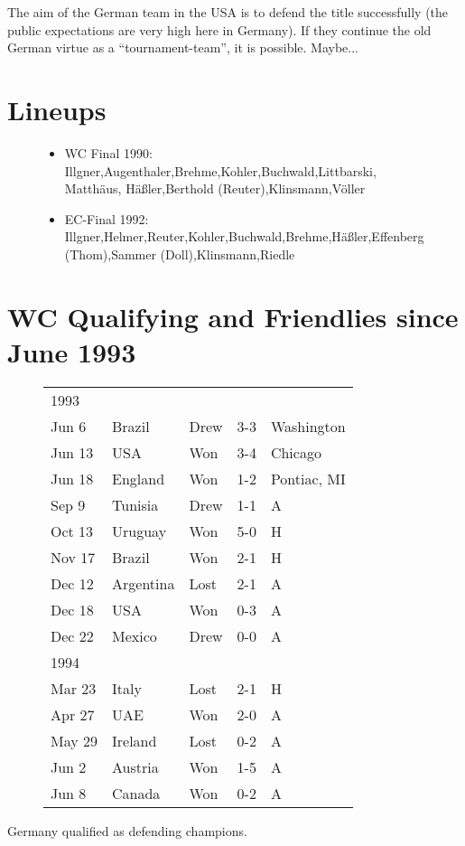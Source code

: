 The aim of the German team in the USA is to defend the title successfully 
(the public expectations are very high here in Germany). If they continue the 
old German virtue as a ``tournament-team'', it is possible. Maybe...
\section{Lineups}
\begin{figure}[H]
\begin{itemize}
\item WC Final 1990: Illgner,Augenthaler,Brehme,Kohler,Buchwald,Littbarski, Matth{\"a}us, H{\"a}{\ss}ler,Berthold (Reuter),Klinsmann,V{\"o}ller   
\item EC-Final 1992: Illgner,Helmer,Reuter,Kohler,Buchwald,Brehme,H{\"a}{\ss}ler,Effenberg (Thom),Sammer (Doll),Klinsmann,Riedle
\end{itemize}
\end{figure}
\section{WC Qualifying and Friendlies since June 1993}
\begin{figure}[H]
\begin{tabular}{l l l c l}
1993 & & & & \\
Jun 6 & Brazil & Drew & 3-3 & Washington \\
Jun 13 & USA & Won & 3-4 & Chicago \\
Jun 18 & England & Won & 1-2 & Pontiac, MI \\
Sep 9 & Tunisia & Drew & 1-1 & A \\
Oct 13 & Uruguay & Won & 5-0 & H \\
Nov 17 & Brazil & Won & 2-1 & H \\
Dec 12 & Argentina & Lost & 2-1 & A \\
Dec 18 & USA & Won & 0-3 & A \\
Dec 22 & Mexico & Drew & 0-0 & A \\
1994 & & & & \\
Mar 23 & Italy & Lost & 2-1 & H \\
Apr 27 & UAE & Won & 2-0 & A \\
May 29 & Ireland & Lost & 0-2 & A \\
Jun 2 & Austria & Won & 1-5 & A \\
Jun 8 & Canada & Won & 0-2 & A \\
\end{tabular}
\end{figure}
Germany qualified as defending champions.
